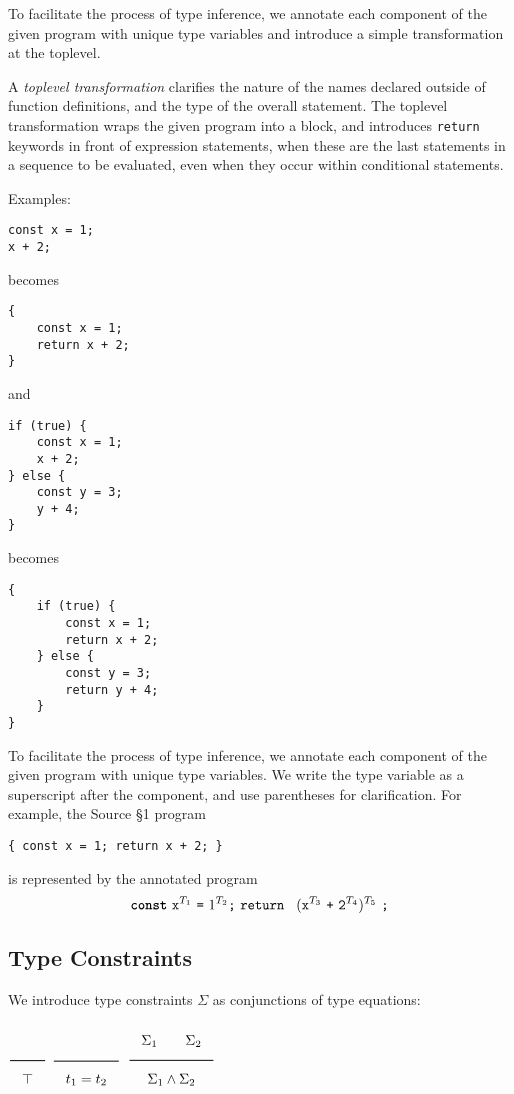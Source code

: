 To facilitate the process of type inference, we annotate each component of the given
program with unique type variables and introduce a simple transformation at the toplevel.

A \emph{toplevel transformation} clarifies the nature
of the names declared outside of function definitions,
and the type of the overall statement. The toplevel
transformation wraps the given program into a block, and introduces \lstinline{return}
keywords in front of expression statements, when these are the last statements in a
sequence to be evaluated, even when they occur within conditional statements.

Examples:

\begin{lstlisting}
const x = 1;
x + 2; 
\end{lstlisting}
becomes
\begin{lstlisting}
{
    const x = 1;
    return x + 2;
}    
\end{lstlisting}
and
\begin{lstlisting}
if (true) {
    const x = 1;    
    x + 2;
} else {
    const y = 3;
    y + 4;
}
\end{lstlisting}
becomes
\begin{lstlisting}
{
    if (true) {
        const x = 1;    
        return x + 2;
    } else {
        const y = 3;
        return y + 4;
    }
}
\end{lstlisting}

To facilitate the process of type inference, we annotate each component of the given
program with unique type variables. We write the type variable as a superscript after
the component, and use parentheses for clarification. For example, the Source \S 1
program
\begin{lstlisting}
{ const x = 1; return x + 2; }
\end{lstlisting}
is represented by the annotated program
\[ 
\Const\ \texttt{x}^{T_1}\ \texttt{=}\ 1^{T_2}\texttt{;}\ 
\texttt{return }\ (\texttt{x}^{T_3} \ \texttt{+} \ \texttt{2}^{T_4})^{T_5} \ \texttt{;}
\]

\subsection{Type Constraints}

We introduce type constraints $\Sigma$ as conjunctions of type equations:

$\Rule{}{\top}$
\hfill 
$\Rule{}{t_1 = t_2}$
\hfill 
$\Rule{\Sigma_1 \qquad \Sigma_2}{\Sigma_1 \wedge \Sigma_2}$

